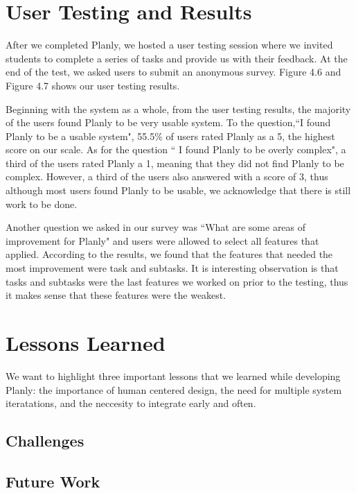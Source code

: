 \section{User Testing and Results}
After we completed Planly, we hosted a user testing session where we invited students to complete a series of tasks and provide us with their feedback. At the end of the test, we asked users to submit an anonymous survey. Figure 4.6 and Figure 4.7 shows our user testing results. 
\par Beginning with the system as a whole, from the user testing results, the majority of the users found Planly to be very usable system. To the question,``I found Planly to be a usable system", 55.5\% of users rated Planly as a 5, the highest score on our scale. As for the question `` I found Planly to be overly complex", a third of the users rated Planly a 1, meaning that they did not find Planly to be complex. However, a third of the users also answered with a score of 3, thus although most users found Planly to be usable, we acknowledge that there is still work to be done. 
\par Another question we asked in our survey was ``What are some areas of improvement for Planly" and users were allowed to select all features that applied. According to the results, we found that the features that needed the most improvement were task and subtasks. It is interesting observation is that tasks and subtasks were the last features we worked on prior to the testing, thus it makes sense that these features were the weakest.  
\section{Lessons Learned}
We want to highlight three important lessons that we learned while developing Planly: the importance of human centered design, the need for multiple system iteratations, and the neccesity to integrate early and often.

\subsection{Challenges}
\subsection{Future Work}

